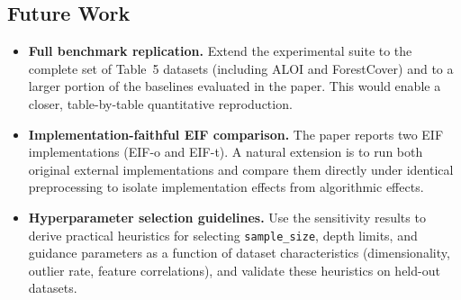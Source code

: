 \subsection{Future Work}
\begin{itemize}
  \item \textbf{Full benchmark replication.} Extend the experimental suite to the complete set of Table~5 datasets (including ALOI and ForestCover) and to a larger portion of the baselines evaluated in the paper. This would enable a closer, table-by-table quantitative reproduction.

  \item \textbf{Implementation-faithful EIF comparison.} The paper reports two EIF implementations (EIF-o and EIF-t). A natural extension is to run both original external implementations and compare them directly under identical preprocessing to isolate implementation effects from algorithmic effects.

  \item \textbf{Hyperparameter selection guidelines.} Use the sensitivity results to derive practical heuristics for selecting \texttt{sample\_size}, depth limits, and guidance parameters as a function of dataset characteristics (dimensionality, outlier rate, feature correlations), and validate these heuristics on held-out datasets.
\end{itemize}
